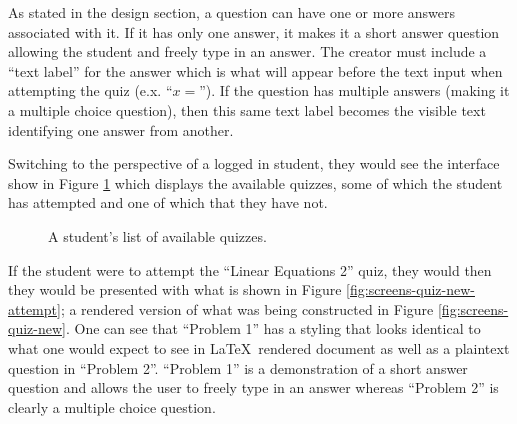 As stated in the design section, a question can have one or more answers associated with it. If it has only one answer, it makes it a short answer question allowing the student and freely type in an answer. The creator must include a ``text label'' for the answer which is what will appear before the text input when attempting the quiz (e.x. ``$x = $''). If the question has multiple answers (making it a multiple choice question), then this same text label becomes the visible text identifying one answer from another.

Switching to the perspective of a logged in student, they would see the interface show in Figure \ref{fig:screens-quiz-list-student} which displays the available quizzes, some of which the student has attempted and one of which that they have not.

\begin{figure}[h!]
	\centering
	\caption{A student's list of available quizzes.}
	\label{fig:screens-quiz-list-student}
\end{figure}

If the student were to attempt the ``Linear Equations 2'' quiz, they would then they would be presented with what is shown in Figure \ref{fig:screens-quiz-new-attempt}; a rendered version of what was being constructed in Figure \ref{fig:screens-quiz-new}. One can see that ``Problem 1'' has a styling that looks identical to what one would expect to see in \LaTeX\ rendered document as well as a plaintext question in ``Problem 2''. ``Problem 1'' is a demonstration of a short answer question and allows the user to freely type in an answer whereas ``Problem 2'' is clearly a multiple choice question.

